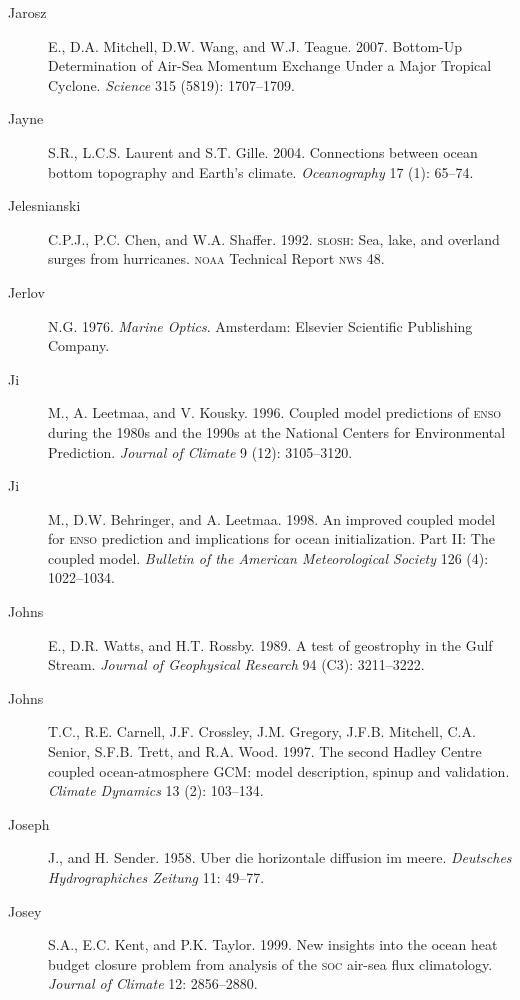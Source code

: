 \begin{description}
\item [Jarosz]E., D.A. Mitchell, D.W. Wang, and
  W.J. Teague. 2007. Bottom-Up Determination of Air-Sea Momentum
  Exchange Under a Major Tropical Cyclone. \textit{Science} 315
  (5819): 1707--1709.

\item [Jayne]S.R., L.C.S. Laurent and S.T. Gille. 2004. Connections
  between ocean bottom topography and Earth's
  climate. \textit{Oceanography} 17 (1): 65--74.

\item [Jelesnianski]C.P.J., P.C. Chen, and
  W.A. Shaffer. 1992. \textsc{slosh}: Sea, lake, and overland surges
  from hurricanes. \textsc{noaa} Technical Report \textsc{nws} 48.

\item[Jerlov]N.G. 1976. \textit{Marine Optics}. Amsterdam: Elsevier
  Scientific Publishing Company.

\item[Ji]M., A. Leetmaa, and V. Kousky. 1996. Coupled model
  predictions of \textsc{enso} during the 1980s and the 1990s at the
  National Centers for Environmental Prediction. \textit{Journal of
    Climate} 9 (12): 3105--3120.

\item[Ji]M., D.W. Behringer, and A. Leetmaa. 1998. An improved coupled
  model for \textsc{enso} prediction and implications for ocean
  initialization. Part II: The coupled model. \textit{Bulletin of the
    American Meteorological Society} 126 (4): 1022--1034.

\item [Johns]E., D.R. Watts, and H.T. Rossby. 1989. A test of
  geostrophy in the Gulf Stream. \textit{Journal of Geophysical
    Research} 94 (C3): 3211--3222.

\item [Johns]T.C., R.E. Carnell, J.F. Crossley, J.M. Gregory,
  J.F.B. Mitchell, C.A. Senior, S.F.B. Trett, and R.A. Wood. 1997. The
  second Hadley Centre coupled ocean-atmosphere GCM: model
  description, spinup and validation. \textit{Climate Dynamics} 13
  (2): 103--134.

\item[Joseph]J., and H. Sender. 1958. Uber die horizontale diffusion
  im meere.  \textit{Deutsches Hydrographiches Zeitung} 11: 49--77.

\item [Josey]S.A., E.C. Kent, and P.K. Taylor. 1999. New insights into
  the ocean heat budget closure problem from analysis of the
  \textsc{soc} air-sea flux climatology. \textit{Journal of Climate}
  12: 2856--2880.
	

\end{description}

